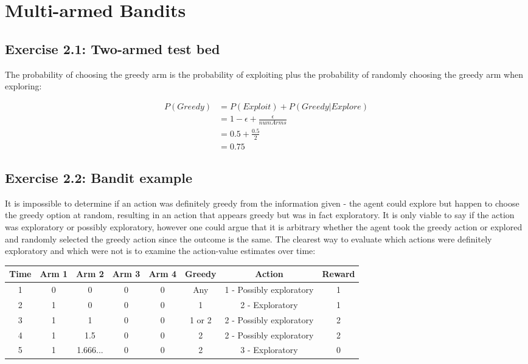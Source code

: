 \section{Multi-armed Bandits}

\subsection*{Exercise 2.1: Two-armed test bed}

The probability of choosing the greedy arm is the probability of exploiting plus the probability of randomly choosing the greedy arm when exploring:

\vspace{-6mm}
\begin{align}
P(Greedy) &= P(Exploit) + P(Greedy | Explore) \nonumber \\
 &= 1 - \epsilon + \frac{\epsilon}{numArms} \label{eqn:2_pgreedy} \\
 &= 0.5 + \frac{0.5}{2} \nonumber \\
 &= 0.75 \nonumber
\end{align}

\subsection*{Exercise 2.2: Bandit example}

It is impossible to determine if an action was definitely greedy from the information given - the agent could explore but happen to choose the greedy option at random, resulting in an action that appears greedy but was in fact exploratory. It is only viable to say if the action was exploratory or possibly exploratory, however one could argue that it is arbitrary whether the agent took the greedy action or explored and randomly selected the greedy action since the outcome is the same. The clearest way to evaluate which actions were definitely exploratory and which were not is to examine the action-value estimates over time:

\vspace{-6mm}
\begin{center}
\renewcommand{\arraystretch}{1.2}
\begin{tabular}{c|c|c|c|c|c|c|c}
    \textbf{Time} & \textbf{Arm 1} & \textbf{Arm 2} & \textbf{Arm 3} & \textbf{Arm 4} & \textbf{Greedy} & \textbf{Action} & \textbf{Reward} \\ 
	\hline 
	1 & 0 & 0 & 0 & 0 & Any & 1 - Possibly exploratory & 1 \\ 
	\hline 
	2 & 1 & 0 & 0 & 0 & 1 & 2 - Exploratory & 1  \\ 
	\hline 
	3 & 1 & 1 & 0 & 0 & 1 or 2 & 2 - Possibly exploratory & 2 \\ 
	\hline 
	4 & 1 & 1.5 & 0 & 0 & 2 & 2 - Possibly exploratory & 2 \\ 
	\hline 
	5 & 1 & 1.666... & 0 & 0 & 2 & 3 - Exploratory & 0 \\ 
\end{tabular}  
\end{center}

